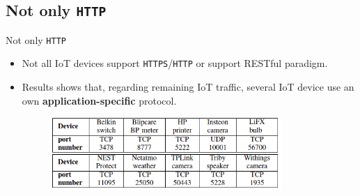 \documentclass[10pt]{beamer}
\begin{document}
\subsection{Not only \texttt{HTTP}}
\begin{frame}{Not only \texttt{HTTP}}

\begin{itemize}
\item Not all IoT devices support \texttt{HTTPS}/\texttt{HTTP} or support RESTful paradigm. 

\item Results shows that, regarding remaining IoT traffic, several IoT device use an own \textbf{application-specific} protocol. 

\begin{figure}
  \includegraphics[width=250pt]{port.png}
\end{figure}

\end{itemize}


\end{frame} 
\end{document}
